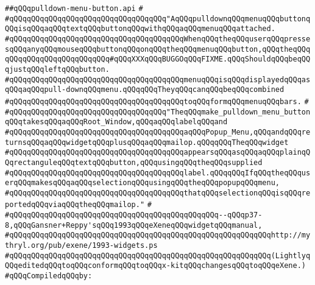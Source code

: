 \label{src/lib/x-kit/widget/old/menu/pulldown-menu-button.api}
\verb|##qQQqpulldown-menu-button.api|\newline
\verb|#|\newline
\verb|#qQQqqQQqqQQqqQQqqQQqqQQqqQQqqQQqqQQq"AqQQqpulldownqQQqmenuqQQqbuttonqQQqisqQQqaqQQqtextqQQqbuttonqQQqwithqQQqaqQQqmenuqQQqattached.|\newline
\verb|#qQQqqQQqqQQqqQQqqQQqqQQqqQQqqQQqqQQqqQQqWhenqQQqtheqQQquserqQQqpressesqQQqanyqQQqmouseqQQqbuttonqQQqonqQQqtheqQQqmenuqQQqbutton,qQQqtheqQQqqQQqqQQqqQQqqQQqqQQqqQQq#qQQqXXXqQQqBUGGOqQQqFIXME.qQQqShouldqQQqbeqQQqjustqQQqleftqQQqbutton.|\newline
\verb|#qQQqqQQqqQQqqQQqqQQqqQQqqQQqqQQqqQQqqQQqmenuqQQqisqQQqdisplayedqQQqasqQQqaqQQqpull-downqQQqmenu.qQQqqQQqTheyqQQqcanqQQqbeqQQqcombined|\newline
\verb|#qQQqqQQqqQQqqQQqqQQqqQQqqQQqqQQqqQQqqQQqtoqQQqformqQQqmenuqQQqbars.|\newline
\verb|#|\newline
\verb|#qQQqqQQqqQQqqQQqqQQqqQQqqQQqqQQqqQQq"TheqQQqmake_pulldown_menu_buttonqQQqtakesqQQqaqQQqRoot_Window,qQQqaqQQqlabelqQQqand|\newline
\verb|#qQQqqQQqqQQqqQQqqQQqqQQqqQQqqQQqqQQqqQQqaqQQqPopup_Menu,qQQqandqQQqreturnsqQQqaqQQqwidgetqQQqplusqQQqaqQQqmailop.qQQqqQQqTheqQQqwidget|\newline
\verb|#qQQqqQQqqQQqqQQqqQQqqQQqqQQqqQQqqQQqqQQqappearsqQQqasqQQqaqQQqplainqQQqrectanguleqQQqtextqQQqbutton,qQQqusingqQQqtheqQQqsupplied|\newline
\verb|#qQQqqQQqqQQqqQQqqQQqqQQqqQQqqQQqqQQqqQQqlabel.qQQqqQQqIfqQQqtheqQQquserqQQqmakesqQQqaqQQqselectionqQQqusingqQQqtheqQQqpopupqQQqmenu,|\newline
\verb|#qQQqqQQqqQQqqQQqqQQqqQQqqQQqqQQqqQQqqQQqthatqQQqselectionqQQqisqQQqreportedqQQqviaqQQqtheqQQqmailop."|\newline
\verb|#|\newline
\verb|#qQQqqQQqqQQqqQQqqQQqqQQqqQQqqQQqqQQqqQQqqQQqqQQq--qQQqp37-8,qQQqGansner+Reppy'sqQQq1993qQQqeXeneqQQqwidgetqQQqmanual,|\newline
\verb|#qQQqqQQqqQQqqQQqqQQqqQQqqQQqqQQqqQQqqQQqqQQqqQQqqQQqqQQqqQQqhttp://mythryl.org/pub/exene/1993-widgets.ps|\newline
\verb|#qQQqqQQqqQQqqQQqqQQqqQQqqQQqqQQqqQQqqQQqqQQqqQQqqQQqqQQqqQQq(LightlyqQQqeditedqQQqtoqQQqconformqQQqtoqQQqx-kitqQQqchangesqQQqtoqQQqeXene.)|\newline
\newline
\verb|#qQQqCompiledqQQqby:|\newline
